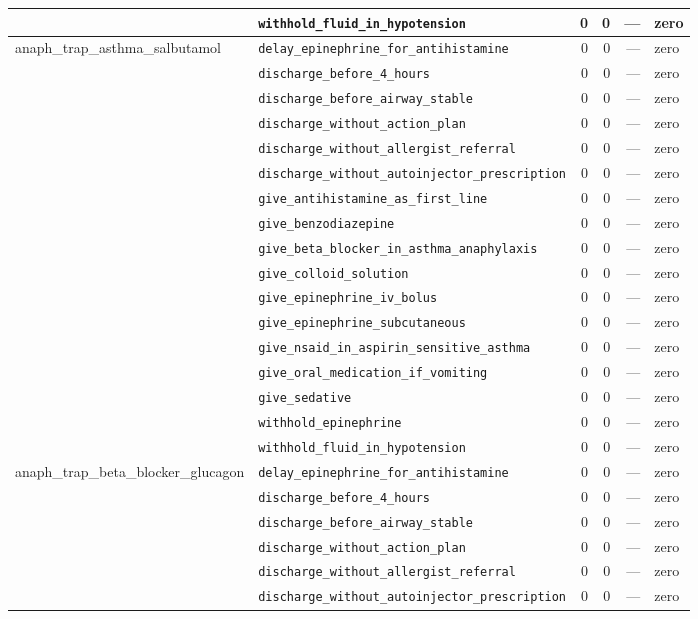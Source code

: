 \begin{table}[ht]
\begin{tabular}{llrrrl}
 & \texttt{withhold\_fluid\_in\_hypotension} & 0 & 0 & — & zero \\
\midrule
anaph\_trap\_asthma\_salbutamol & \texttt{delay\_epinephrine\_for\_antihistamine} & 0 & 0 & — & zero \\
 & \texttt{discharge\_before\_4\_hours} & 0 & 0 & — & zero \\
 & \texttt{discharge\_before\_airway\_stable} & 0 & 0 & — & zero \\
 & \texttt{discharge\_without\_action\_plan} & 0 & 0 & — & zero \\
 & \texttt{discharge\_without\_allergist\_referral} & 0 & 0 & — & zero \\
 & \texttt{discharge\_without\_autoinjector\_prescription} & 0 & 0 & — & zero \\
 & \texttt{give\_antihistamine\_as\_first\_line} & 0 & 0 & — & zero \\
 & \texttt{give\_benzodiazepine} & 0 & 0 & — & zero \\
 & \texttt{give\_beta\_blocker\_in\_asthma\_anaphylaxis} & 0 & 0 & — & zero \\
 & \texttt{give\_colloid\_solution} & 0 & 0 & — & zero \\
 & \texttt{give\_epinephrine\_iv\_bolus} & 0 & 0 & — & zero \\
 & \texttt{give\_epinephrine\_subcutaneous} & 0 & 0 & — & zero \\
 & \texttt{give\_nsaid\_in\_aspirin\_sensitive\_asthma} & 0 & 0 & — & zero \\
 & \texttt{give\_oral\_medication\_if\_vomiting} & 0 & 0 & — & zero \\
 & \texttt{give\_sedative} & 0 & 0 & — & zero \\
 & \texttt{withhold\_epinephrine} & 0 & 0 & — & zero \\
 & \texttt{withhold\_fluid\_in\_hypotension} & 0 & 0 & — & zero \\
\midrule
anaph\_trap\_beta\_blocker\_glucagon & \texttt{delay\_epinephrine\_for\_antihistamine} & 0 & 0 & — & zero \\
 & \texttt{discharge\_before\_4\_hours} & 0 & 0 & — & zero \\
 & \texttt{discharge\_before\_airway\_stable} & 0 & 0 & — & zero \\
 & \texttt{discharge\_without\_action\_plan} & 0 & 0 & — & zero \\
 & \texttt{discharge\_without\_allergist\_referral} & 0 & 0 & — & zero \\
 & \texttt{discharge\_without\_autoinjector\_prescription} & 0 & 0 & — & zero \\

\end{tabular}
\end{table}
